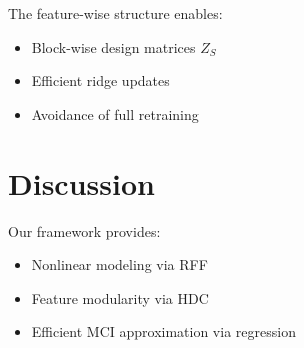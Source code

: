 \documentclass[11pt]{article}
\begin{document}
The feature-wise structure enables:

\begin{itemize}
    \item Block-wise design matrices $Z_S$
    \item Efficient ridge updates
    \item Avoidance of full retraining
\end{itemize}

\section{Discussion}

Our framework provides:

\begin{itemize}
    \item Nonlinear modeling via RFF
    \item Feature modularity via HDC
    \item Efficient MCI approximation via regression
\end{itemize}




\end{document}
